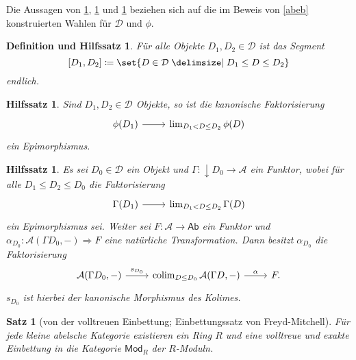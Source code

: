 \documentclass[a4paper, parskip=half]{scrartcl}
\theoremstyle{marginbreak}
\newtheorem{theorem}[remark]{Satz}
\newtheorem{lemma}[remark]{Hilfssatz}
\newtheorem{defle}[remark]{Definition und Hilfssatz}
\newcommand\ccat\mathsf
\newcommand\cat\mathcal
\newcommand{\down}[1]{{\downarrow}#1}
\DeclareMathOperator{\colim}{colim}
\begin{document}
		Die Aussagen von \ref{fin}, \ref{fact} und \ref{func} beziehen sich auf
		die im Beweis von \ref{abeb} konstruierten
		Wahlen für $\cat{D}$ und $\phi$.
		\begin{defle}\label{fin}
			Für alle Objekte $D_1,D_2\in\cat{D}$ ist das Segment
				\[
					[D_1, D_2] \coloneqq\set{D\in\cat{D}\given D_1\leq D\leq D_2}
				\]
			endlich.
		\end{defle}
		\begin{lemma}\label{fact}
			Sind $D_1, D_2\in\cat{D}$ Objekte, so ist die kanonische Faktorisierung
			\[
				\begin{tikzcd}
					\phi(D_1) \arrow[r] & \lim_{D_1<D\leq D_2}\phi(D)
				\end{tikzcd}
			\]
			ein Epimorphismus.
		\end{lemma}
		\begin{lemma}\label{func}
			Es sei $D_0\in\cat{D}$ ein Objekt und $\Gamma\colon \down{D_0}\to\cat{A}$
			ein Funktor, wobei für alle $D_1\leq D_2\leq D_0$ die Faktorisierung
			\[
				\begin{tikzcd}
					\Gamma(D_1) \arrow[r] & \lim_{D_1<D\leq D_2} \Gamma(D)
				\end{tikzcd}
			\]
			ein Epimorphismus sei. Weiter sei $F\colon\cat{A}\to\ccat{Ab}$ ein
			Funktor und $\alpha_{D_0}\colon \cat{A}(\Gamma D_0, {-})\Rightarrow F$
			eine natürliche Transformation. Dann besitzt $\alpha_{D_0}$ die
			Faktorisierung
			\[
				\begin{tikzcd}
					\cat{A}(\Gamma D_0, {-}) \arrow{r}{s_{D_0}} & \colim_{D\leq D_0}\cat{A}(\Gamma D, {-}) \arrow{r}{\alpha} & F.
				\end{tikzcd}
			\]
			$s_{D_0}$ ist hierbei der kanonische Morphismus des Kolimes.
		\end{lemma}
		\begin{theorem}[von der volltreuen Einbettung; Einbettungssatz von Freyd-Mitchell]
			Für jede kleine abelsche Kategorie existieren ein Ring $R$ und eine volltreue
			und exakte Einbettung in die Kategorie $\ccat{Mod}_R$ der $R$-Moduln.
		\end{theorem}
\end{document}
